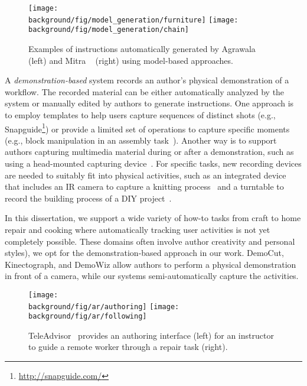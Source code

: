 \begin{figure*}[t!]
  \centering
  \texttt{[image: \\background/fig/model\_generation/furniture]}
  \texttt{[image: \\background/fig/model\_generation/chain]}
  \caption{Examples of instructions automatically generated by Agrawala \ea~\cite{agrawala2003designing} (left) and Mitra \ea~\cite{mitra2010illustrating} (right) using model-based approaches.}
  \label{fig:related_models}
\end{figure*}

A \emph{demonstration-based} system records an author's physical demonstration of a workflow. The recorded material can be either automatically analyzed by the system or manually edited by authors to generate instructions.
%
One approach is to employ templates to help users capture sequences of distinct shots (e.g., Snapguide\footnote{\url{http://snapguide.com/}}) or provide a limited set of operations to capture specific moments (e.g., block manipulation in an assembly task~\cite{Ranjan:2007,Gupta:2012ku}).
%
Another way is to support authors capturing multimedia material during or after a demonstration, such as using a head-mounted capturing device~\cite{carter2015authoring}. For specific tasks, new recording devices are needed to suitably fit into physical activities, such as an integrated device that includes an IR camera to capture a knitting process~\cite{Rosner:2008:SAK:1409635.1409682} and a turntable to record the building process of a DIY project~\cite{Tseng:2015:SPT:2771839.2771869}.

In this dissertation, we support a wide variety of how-to tasks from craft to home repair and cooking where automatically tracking user activities is not yet completely possible. These domains often involve author creativity and personal styles), we opt for the demonstration-based approach in our work.
%
DemoCut, Kinectograph, and DemoWiz allow authors to perform a physical demonstration in front of a camera, while our systems semi-automatically capture the activities.


\begin{figure*}[t!]
  \centering
  \texttt{[image: \\background/fig/ar/authoring]}
  \texttt{[image: \\background/fig/ar/following]}
  \caption{TeleAdvisor~\cite{Gurevich:2012ko} provides an authoring interface (left) for an instructor to guide a remote worker through a repair task (right).}
  \label{fig:related_teleadvisor}
\end{figure*}

